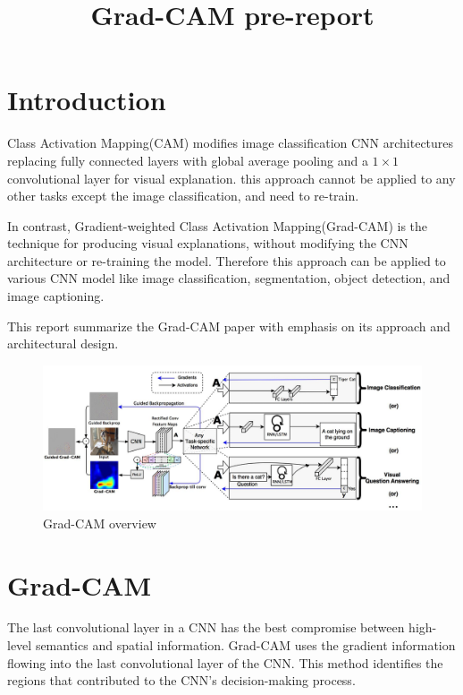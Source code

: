 \documentclass[extendedabs]{bmvc2k}
\begin{document}
\title{Grad-CAM pre-report}

 

\maketitle
\noindent

\section{Introduction}
Class Activation Mapping(CAM)\cite{cam} modifies image classification CNN architectures replacing fully connected layers with global average pooling and a $1\times1$ convolutional layer for visual explanation. this approach cannot be applied to any other tasks except the image classification, and need to re-train. 
 
In contrast, Gradient-weighted Class Activation Mapping(Grad-CAM)\cite{gradcam} is the technique for producing visual explanations, without modifying the CNN architecture or re-training the model. Therefore this approach can be applied to various CNN model like image classification, segmentation, object detection, and image captioning.

This report summarize the Grad-CAM paper\cite{gradcam} with emphasis on its approach and architectural design.

\begin{figure}[t]
\centering
	\includegraphics[width=\linewidth]{images/fig1.PNG}
	\caption{
		Grad-CAM overview}
	\vspace{-2mm}
        \label{fig:gradcamoverview}
\end{figure}

\section{Grad-CAM}
The last convolutional layer in a CNN has the best compromise between high-level semantics and spatial information. Grad-CAM uses the gradient information flowing into the last convolutional layer of the CNN. 
This method identifies the regions that contributed to the CNN's decision-making process.
\end{document}
